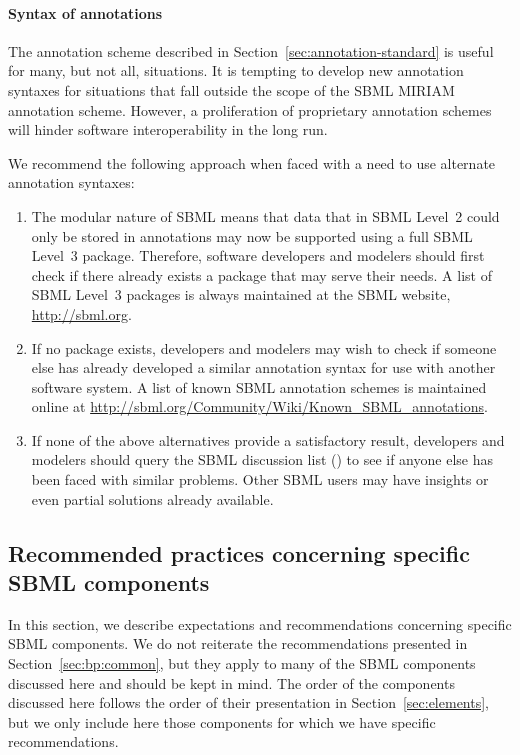 \paragraph{Syntax of annotations}

The annotation scheme described in
Section~\ref{sec:annotation-standard} is useful for many, but not
all, situations.  It is tempting to develop new annotation
syntaxes for situations that fall outside the scope of the SBML
MIRIAM annotation scheme.  However, a proliferation of
proprietary annotation schemes will hinder software
interoperability in the long run.

We recommend the following approach when faced with a need to use
alternate annotation syntaxes:
\begin{enumerate}

\item The modular nature of SBML \thisLV means that data that in
  SBML Level~2 could only be stored in annotations may now be
  supported using a full SBML Level~3 package.  Therefore,
  software developers and modelers should first check if there
  already exists a package that may serve their needs.  A list of
  SBML Level~3 packages is always maintained at the SBML website,
  \url{http://sbml.org}.
  
\item If no package exists, developers and modelers may wish to
  check if someone else has already developed a similar annotation
  syntax for use with another software system.  A list of known
  SBML annotation schemes is maintained online at 
  \url{http://sbml.org/Community/Wiki/Known_SBML_annotations}.

\item If none of the above alternatives provide a satisfactory
  result, developers and modelers should query the SBML discussion
  list ()
  to see if anyone else has been faced with similar problems.
  Other SBML users may have insights or even partial solutions
  already available.

\end{enumerate}


\subsection{Recommended practices concerning specific SBML components}
\label{sec:bp:specifics}

In this section, we describe expectations and recommendations
concerning specific SBML components.  We do not reiterate the
recommendations presented in Section~\ref{sec:bp:common}, but they
apply to many of the SBML components discussed here and should be
kept in mind.  The order of the components discussed here follows
the order of their presentation in Section~\ref{sec:elements}, but
we only include here those components for which we have specific
recommendations.



